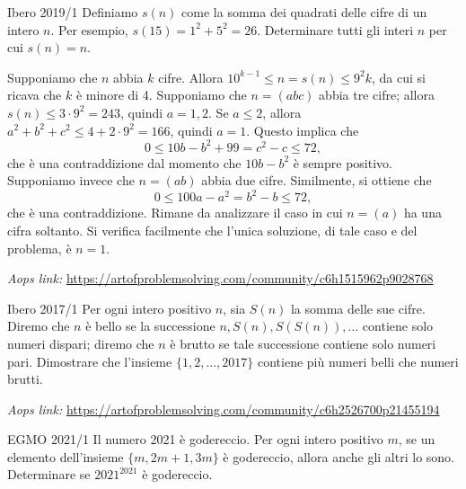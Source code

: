 \documentclass{article}
\begin{document}
\begin{proposition}{Ibero 2019/1}{}
	Definiamo $s(n)$ come la somma dei quadrati delle cifre di un intero $n$.
	Per esempio, $s(15)=1^2+5^2=26$. Determinare tutti gli interi $n$ per cui
	$s(n)=n$.
\end{proposition}

Supponiamo che $n$ abbia $k$ cifre. Allora $10^{k-1}\le n=s(n) \le 9^2k$,
da cui si ricava che $k$ è minore di 4.
Supponiamo che $n=(abc)$ abbia tre cifre;
allora $s(n)\le 3\cdot 9^2=243$, quindi $a=1,2$. Se $a\le 2$, allora
$a^2+b^2+c^2\le 4+2\cdot 9^2=166$, quindi $a=1$. Questo implica che
\begin{equation*}
	0\le 10b-b^2+99=c^2-c \le 72,
\end{equation*}
che è una contraddizione dal momento che $10b-b^2$ è sempre positivo.
Supponiamo invece che $n=(ab)$ abbia due cifre. Similmente, si ottiene che
\begin{equation*}
	0\le 100a-a^2=b^2-b \le 72,
\end{equation*}
che è una contraddizione. Rimane da analizzare il caso in cui $n=(a)$ ha
una cifra soltanto. Si verifica facilmente che l'unica soluzione, di tale caso
e del problema, è $n=1$.

\vspace{0.5cm}
\textit{Aops link:}
\href{https://artofproblemsolving.com/community/c6h1515962p9028768}
{https://artofproblemsolving.com/community/c6h1515962p9028768}

\begin{proposition}{Ibero 2017/1}{}
	Per ogni intero positivo $n$, sia $S(n)$ la somma delle sue cifre.
	Diremo che $n$ è bello
	se la successione $n, S(n), S(S(n)),\dots$ contiene solo
	numeri dispari; diremo che $n$ è brutto se tale successione
	contiene solo numeri pari. Dimostrare che l'insieme
	$\{1,2,\dots,2017 \}$ contiene più numeri belli che numeri brutti.
\end{proposition}

\vspace{0.5cm}
\textit{Aops link:}
\href{https://artofproblemsolving.com/community/c6h2526700p21455194}
{https://artofproblemsolving.com/community/c6h2526700p21455194}

\begin{proposition}{EGMO 2021/1}{}
	Il numero 2021 è godereccio. Per ogni intero positivo
	$m$, se un elemento dell'insieme $\{ m,2m+1,3m \}$ è
	godereccio, allora anche gli altri lo sono.
Determinare se $2021^{2021}$ è godereccio.
\end{proposition}
\end{document}
